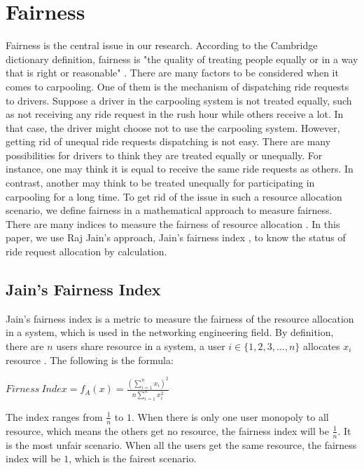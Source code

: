\section{Fairness}

Fairness is the central issue in our research. According to the Cambridge dictionary definition, fairness is "the quality of treating people equally or in a way that is right or reasonable" \cite{noauthor_fairness_nodate}. There are many factors to be considered when it comes to carpooling. One of them is the mechanism of dispatching ride requests to drivers. Suppose a driver in the carpooling system is not treated equally, such as not receiving any ride request in the rush hour while others receive a lot. In that case, the driver might choose not to use the carpooling system. However, getting rid of unequal ride requests dispatching is not easy. There are many possibilities for drivers to think they are treated equally or unequally. For instance, one may think it is equal to receive the same ride requests as others. In contrast, another may think to be treated unequally for participating in carpooling for a long time. To get rid of the issue in such a resource allocation scenario, we define fairness in a mathematical approach to measure fairness. There are many indices to measure the fairness of resource allocation \cite{jain_990045_nodate}. In this paper, we use Raj Jain's approach, Jain's fairness index \cite{jain_quantitative_1998}, to know the status of ride request allocation by calculation.

\subsection{Jain's Fairness Index}

Jain's fairness index is a metric to measure the fairness of the resource allocation in a system, which is used in the networking engineering field. By definition, there are $n$ users share resource in a system, a user $i \in \{1,2,3,...,n\}$ allocates $x_i$ resource \cite{jain_quantitative_1998}. The following is the formula:

$Firness\ Index = f_A(x) = \frac{\left(\sum\limits_{i=1}^{n} x_i\right)^2}{n \sum\limits_{i=1}^{n} x_i^2}$

The index ranges from $\frac{1}{n}$ to $1$. When there is only one user monopoly to all resource, which means the others get no resource, the fairness index will be $\frac{1}{n}$. It is the most unfair scenario. When all the users get the same resource, the fairness index will be $1$, which is the fairest scenario.